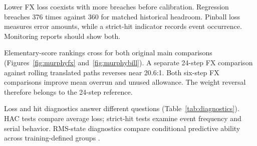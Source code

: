 \documentclass[11pt,a4paper]{article}
\begin{document}
Lower FX loss coexists with more breaches before calibration. Regression breaches 376 times against 360 for matched historical headroom. Pinball loss measures error amounts, while a strict-hit indicator records event occurrence. Monitoring reports should show both.

Elementary-score rankings cross for both original main comparisons (Figures~\ref{fig:murphyfx} and~\ref{fig:murphybill}). A separate 24-step FX comparison against rolling translated paths reverses near 20.6:1. Both six-step FX comparisons improve mean overrun and unused allowance. The weight reversal therefore belongs to the 24-step reference.

Loss and hit diagnostics answer different questions (Table~\ref{tab:diagnostics}). HAC tests compare average loss; strict-hit tests examine event frequency and serial behavior. RMS-state diagnostics compare conditional predictive ability across training-defined groups \citep{gw2006}.
\end{document}
